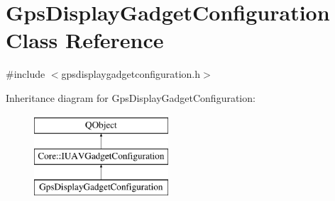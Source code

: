 \hypertarget{class_gps_display_gadget_configuration}{\section{Gps\-Display\-Gadget\-Configuration Class Reference}
\label{class_gps_display_gadget_configuration}
}


{\ttfamily \#include $<$gpsdisplaygadgetconfiguration.\-h$>$}

Inheritance diagram for Gps\-Display\-Gadget\-Configuration\-:\begin{figure}[H]
\begin{center}
\leavevmode
\includegraphics[height=3.000000cm]{class_gps_display_gadget_configuration}
\end{center}
\end{figure}

